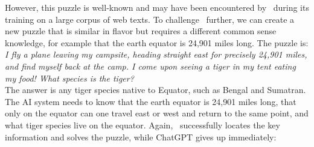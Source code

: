 However, this puzzle is well-known and may have been encountered by \DV\ during its training on a large corpus of web texts. To challenge \DV\ further, we can create a new puzzle that is similar in flavor but requires a different common sense knowledge, for example that the earth equator is 24,901 miles long. The puzzle is:\\

\emph{I fly a plane leaving my campsite, heading straight east for precisely 24,901 miles, and find myself back at the camp. I come upon seeing a tiger in my tent eating my food! What species is the tiger?}\\

The answer is any tiger species native to Equator, such as Bengal and Sumatran. The AI system needs to know that the earth equator is 24,901 miles long, that only on the equator can one travel east or west and return to the same point, and what tiger species live on the equator. Again, \DV\ successfully locates the key information and solves the puzzle, while ChatGPT gives up immediately:


